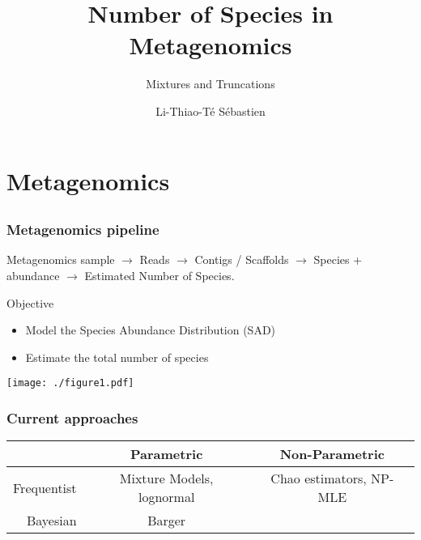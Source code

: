 \documentclass{beamer}
\begin{document}
\title{Number of Species in Metagenomics}
\subtitle{Mixtures and Truncations}
\author[Li-Thiao-Té S.]{Li-Thiao-Té Sébastien}
\date{}
\begin{frame}
\titlepage
\end{frame}

\section{Metagenomics}
\subsection*{}

\begin{frame} \frametitle{Metagenomics pipeline}
Metagenomics sample $\longrightarrow$ Reads $\longrightarrow$ Contigs / Scaffolds $\longrightarrow$ Species + abundance $\longrightarrow$ Estimated Number of Species.

\begin{block}{Objective}
\begin{itemize}
 \item Model the Species Abundance Distribution (SAD)
 \item Estimate the total number of species
\end{itemize}
\end{block}
\begin{center}
 \texttt{[image: ./figure1.pdf]}
\end{center}

\end{frame}

\begin{frame}\frametitle{Current approaches}

\begin{tabular}{r|c|c}
            & Parametric & Non-Parametric  \\ \hline
Frequentist & Mixture Models, lognormal & Chao estimators, NP-MLE \\ \hline
Bayesian    & Barger & \\ \hline
\end{tabular} 
\end{frame}
\end{document}
